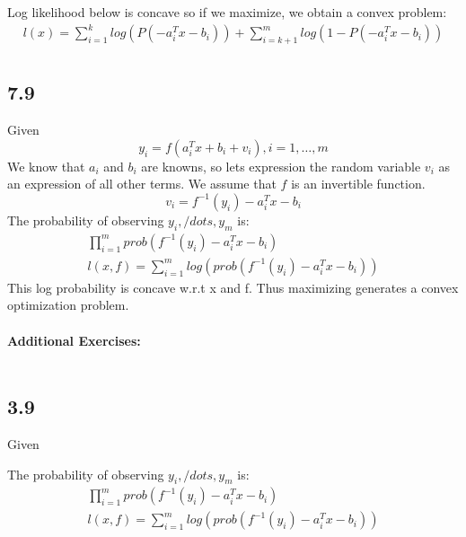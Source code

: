 \documentclass[12pt]{article}
\begin{document}
Log likelihood below is concave so if we maximize, we obtain a convex problem:
\begin{equation*}
\begin{aligned}
l(x) = \sum_{i=1}^{k}log(P(-a_i^Tx-b_i))+\sum_{i=k+1}^{m}log(1-P(-a_i^Tx-b_i))\\ 
\end{aligned}
\end{equation*}

\subsection*{7.9}
Given $$y_i = f(a_i^Tx +b_i +v_i), i=1,\dots,m$$
We know that $a_i$ and $b_i$ are knowns, so lets expression the random variable $v_i$ as an expression of all other terms. We assume that $f$ is an invertible function.
$$v_i = f^{-1}(y_i)-a_i^Tx-b_i$$
The probability of observing $y_i,/dots,y_m$ is:
\begin{equation*}
\begin{aligned}
\prod_{i=1}^{m}prob(f^{-1}(y_i)-a_i^Tx-b_i)\\
l(x, f) = \sum_{i=1}^{m}log(prob(f^{-1}(y_i)-a_i^Tx-b_i))
\end{aligned}
\end{equation*}
This log probability is concave w.r.t x and f. Thus maximizing generates a convex optimization problem.\\\\

\textbf{Additional Exercises:}\\\\

\subsection*{3.9}
Given $$$$

The probability of observing $y_i,/dots,y_m$ is:
\begin{equation*}
\begin{aligned}
\prod_{i=1}^{m}prob(f^{-1}(y_i)-a_i^Tx-b_i)\\
l(x, f) = \sum_{i=1}^{m}log(prob(f^{-1}(y_i)-a_i^Tx-b_i))
\end{aligned}
\end{equation*}

 
\end{document}
